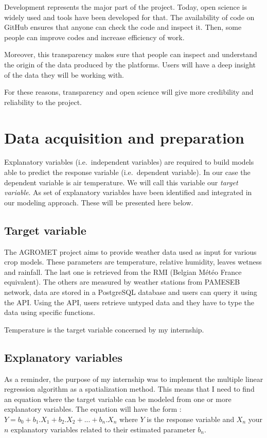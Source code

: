 \documentclass[12pt,twoside]{reedthesis}
\theoremstyle{definition}
\theoremstyle{definition}
\theoremstyle{definition}
\theoremstyle{remark}
\begin{document}
Development represents the major part of the project. Today, open
science is widely used and tools have been developed for that. The
availability of code on GitHub ensures that anyone can check the code
and inspect it. Then, some people can improve codes and increase
efficiency of work.

Moreover, this transparency makes sure that people can inspect and
understand the origin of the data produced by the platforms. Users will
have a deep insight of the data they will be working with.

For these reasons, transparency and open science will give more
credibility and reliability to the project.

\chapter{Data acquisition and preparation}\label{data-acq}

Explanatory variables (i.e.~independent variables) are required to build
models able to predict the response variable (i.e.~dependent variable).
In our case the dependent variable is air temperature. We will call this
variable our \emph{target variable}. As set of explanatory variables
have been identified and integrated in our modeling approach. These will
be presented here below.

\section{Target variable}\label{target-variable}

The AGROMET project aims to provide weather data used as input for
various crop models. These parameters are temperature, relative
humidity, leaves wetness and rainfall. The last one is retrieved from
the RMI (Belgian Météo France equivalent). The others are measured by
weather stations from PAMESEB network, data are stored in a PostgreSQL
database and users can query it using the API. Using the API, users
retrieve untyped data and they have to type the data using specific
functions.

Temperature is the target variable concerned by my internship.

\section{Explanatory variables}\label{explanatory-variables}

As a reminder, the purpose of my internship was to implement the
multiple linear regression algorithm as a spatialization method. This
means that I need to find an equation where the target variable can be
modeled from one or more explanatory variables. The equation will have
the form : \(Y = b_0 + b_1.X_1 + b_2.X_2 + ... + b_n.X_n\) where \(Y\)
is the response variable and \(X_n\) your \(n\) explanatory variables
related to their estimated parameter \(b_n\).
\end{document}
